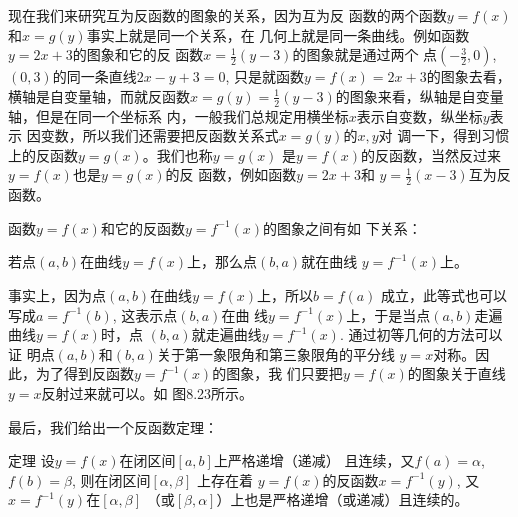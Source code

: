 现在我们来研究互为反函数的图象的关系，因为互为反
函数的两个函数$y=f(x)$和$x=g(y)$事实上就是同一个关系，在
几何上就是同一条曲线。例如函数$y=2x+3$的图象和它的反
函数$x=\frac{1}{2}(y-3)$的图象就是通过两个
点$\left(-\frac{3}{2},0\right)$, $(0,3)$的同一条直线$2x-y+3=0$, 只是就函数$y=f(x)=2x+
3$的图象去看，横轴是自变量轴，而就反函数$x=g(y)=\frac{1}{2}
(y-3)$的图象来看，纵轴是自变量轴，但是在同一个坐标系
内，一般我们总规定用横坐标$x$表示自变数，纵坐标$y$表示
因变数，所以我们还需要把反函数关系式$x=g(y)$的$x,y$对
调一下，得到习惯上的反函数$y=g(x)$。我们也称$y=g(x)$
是$y=f(x)$的反函数，当然反过来$y=f(x)$也是$y=g(x)$的反
函数，例如函数$y=2x+3$和 $y=\frac{1}{2}(x-3)$互为反函数。

函数$y=f(x)$和它的反函数$y=f^{-1}(x)$的图象之间有如
下关系：

若点$(a,b)$在曲线$y=f(x)$上，那么点$(b,a)$就在曲线
$y=f^{-1}(x)$上。

事实上，因为点$(a,b)$在曲线$y=f(x)$上，所以$b=f(a)$
成立，此等式也可以写成$a=f^{-1}(b)$, 这表示点$(b,a)$在曲
线$y=f^{-1}(x)$上，于是当点$(a,b)$走遍曲线$y=f(x)$时，点
$(b,a)$就走遍曲线$y=f^{-1}(x)$. 通过初等几何的方法可以证
明点$(a,b)$和$(b,a)$关于第一象限角和第三象限角的平分线
$y=x$对称。因此，为了得到反函数$y=f^{-1}(x)$的图象，我
们只要把$y=f(x)$的图象关于直线$y=x$反射过来就可以。如
图8.23所示。
\begin{figure}[htp]
    \centering
{}
    \caption{}
\end{figure}


最后，我们给出一个反函数定理：

\begin{blk}{定理}
    设$y=f(x)$在闭区间$[a,b]$上严格递增（递减）
且连续，又$f(a)=\alpha$, $f(b)=\beta$, 则在闭区间$[\alpha,\beta]$  上存在着
$y=f(x)$的反函数$x=f^{-1}(y)$, 又$x=f^{-1}(y)$在$[\alpha,\beta]$  （或$[\beta,\alpha]$）上也是严格递增（或递减）且连续的。
\end{blk}

